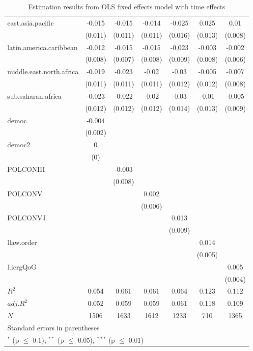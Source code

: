 \begin{table}[p]
\begin{tabular}{l*{6}{c}}
east.asia.pacific 		&-0.015 		&-0.015 		&-0.014 		&-0.025 		&0.025\sym{**} 		&0.01 \\
  		&(0.011) 		&(0.011) 		&(0.011) 		&(0.016) 		&(0.013) 		&(0.008) \\
latin.america.caribbean 		&-0.012 		&-0.015\sym{**} 		&-0.015\sym{*} 		&-0.023\sym{**} 		&-0.003 		&-0.002 \\
  		&(0.008) 		&(0.007) 		&(0.008) 		&(0.009) 		&(0.008) 		&(0.006) \\
middle.east.north.africa 		&-0.019\sym{*} 		&-0.023\sym{**} 		&-0.02\sym{*} 		&-0.03\sym{**} 		&-0.005 		&-0.007 \\
  		&(0.011) 		&(0.011) 		&(0.011) 		&(0.012) 		&(0.012) 		&(0.008) \\
sub.saharan.africa 		&-0.023\sym{*} 		&-0.022\sym{*} 		&-0.02\sym{*} 		&-0.03\sym{**} 		&-0.01 		&-0.005 \\
  		&(0.012) 		&(0.012) 		&(0.012) 		&(0.014) 		&(0.013) 		&(0.009) \\
democ 		&-0.004\sym{*} 		& 		& 		& 		& 		& \\
  		&(0.002) 		& 		& 		& 		& 		& \\
democ2 		&0\sym{*} 		& 		& 		& 		& 		& \\
  		&(0) 		& 		& 		& 		& 		& \\
POLCONIII 		& 		&-0.003 		& 		& 		& 		& \\
  		& 		&(0.008) 		& 		& 		& 		& \\
POLCONV 		& 		& 		&0.002 		& 		& 		& \\
  		& 		& 		&(0.006) 		& 		& 		& \\
POLCONVJ 		& 		& 		& 		&0.013 		& 		& \\
  		& 		& 		& 		&(0.009) 		& 		& \\
llaw.order 		& 		& 		& 		& 		&0.014\sym{***} 		& \\
  		& 		& 		& 		& 		&(0.005) 		& \\
l.icrgQoG 		& 		& 		& 		& 		& 		&0.005 \\
  		& 		& 		& 		& 		& 		&(0.004) \\
\hline
$R^2$ 		&0.054 		&0.061 		&0.061 		&0.064 		&0.123 		&0.112 \\
$adj.R^2$ 		&0.052 		&0.059 		&0.059 		&0.061 		&0.118 		&0.109 \\
$N$ 		&\multicolumn{1}{c}{1506} 		&\multicolumn{1}{c}{1633} 		&\multicolumn{1}{c}{1612} 		&\multicolumn{1}{c}{1233} 		&\multicolumn{1}{c}{710} 		&\multicolumn{1}{c}{1365} \\
\hline\hline
\multicolumn{7}{l}{\footnotesize Standard errors in parentheses}\\
\multicolumn{7}{l}{\footnotesize $^{*}$ (p $\le$ 0.1), $^{**}$ (p $\le$ 0.05), $^{***}$ (p $\le$ 0.01)}\\
\end{tabular}
\caption{Estimation results from OLS fixed effects model with time effects}
\label{tab:fe9}
\end{table}
